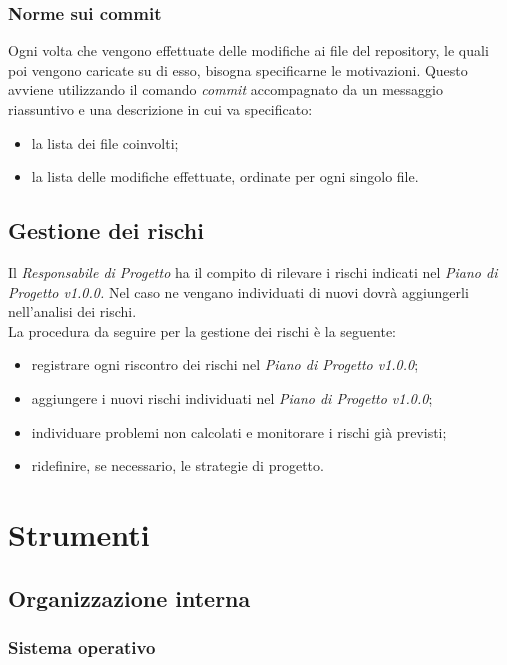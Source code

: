 \documentclass[../NormediProgetto.tex]{subfiles}
\begin{document}
	\subsubsection{Norme sui commit}
	
	Ogni volta che vengono effettuate delle modifiche ai file del repository, le quali poi vengono caricate su di esso, bisogna specificarne le motivazioni. Questo avviene utilizzando il comando \textit{commit} accompagnato da un messaggio riassuntivo e una descrizione in cui va specificato: 
	\begin{itemize}
		\item la lista dei file coinvolti;
		\item la lista delle modifiche effettuate, ordinate per ogni singolo file.
	\end{itemize}
	\subsection{Gestione dei rischi}
	
	Il \textit{Responsabile di Progetto} ha il compito di rilevare i rischi indicati nel \textit{Piano di Progetto v1.0.0.} Nel caso ne vengano individuati di nuovi dovrà aggiungerli nell'analisi dei rischi. 
	\\ \noindent La procedura da seguire per la gestione dei rischi è la seguente:
	\begin{itemize}
		\item registrare ogni riscontro dei rischi nel \textit{Piano di Progetto v1.0.0};
		\item aggiungere i nuovi rischi individuati nel \textit{Piano di Progetto v1.0.0};
		\item individuare problemi non calcolati e monitorare i rischi già previsti;
		\item ridefinire, se necessario, le strategie di progetto.
	\end{itemize}
	
	\section{Strumenti}
	
	\subsection{Organizzazione interna}
	
	\subsubsection{Sistema operativo}
	
\end{document}
